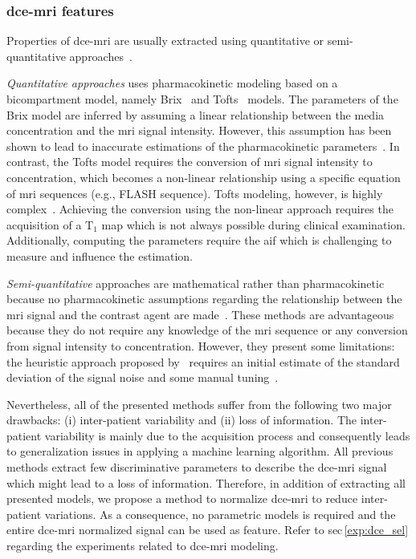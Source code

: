 \documentclass[a4paper,num-refs]{wiley-article}
\begin{document}
\subsubsection{\acs*{dce}-\acs*{mri} features}

Properties of \ac{dce}-\ac{mri} are usually extracted using quantitative or
semi-quantitative approaches~\cite{lemaitre2015computer}.

\emph{Quantitative approaches} uses pharmacokinetic modeling based on a
bicompartment model, namely Brix~\cite{brix1991pharmacokinetic} and
Tofts~\cite{tofts1995quantitative} models. The parameters of the Brix model
are inferred by assuming a linear relationship between the media concentration
and the \ac{mri} signal intensity. However, this assumption has been shown to
lead to inaccurate estimations of the pharmacokinetic
parameters~\cite{heilmann2006determination}. In contrast, the Tofts model
requires the conversion of \ac{mri} signal intensity to concentration, which
becomes a non-linear relationship using a specific equation of \ac{mri}
sequences (e.g., FLASH sequence). Tofts modeling, however, is highly
complex~\cite{gliozzi2011phenomenological}. Achieving the conversion using the
non-linear approach requires the acquisition of a T$_1$ map which is not always
possible during clinical examination. Additionally, computing the parameters
require the \ac{aif} which is challenging to measure and influence the estimation.

\emph{Semi-quantitative} approaches are mathematical rather than
pharmacokinetic because no pharmacokinetic assumptions regarding the
relationship between the \ac{mri} signal and the contrast agent are
made~\cite{huisman2001accurate,gliozzi2011phenomenological}. These methods are
advantageous because they do not require any knowledge of the \ac{mri} sequence
or any conversion from signal intensity to concentration. However, they present
some limitations: the heuristic approach proposed
by~\citeauthor{huisman2001accurate} requires an initial estimate of the
standard deviation of the signal noise and some manual
tuning~\cite{huisman2001accurate}.

Nevertheless, all of the presented methods suffer from the following two major
drawbacks: (i) inter-patient variability and (ii) loss of information. The
inter-patient variability is mainly due to the acquisition process and
consequently leads to generalization issues in applying a machine learning
algorithm. All previous methods extract few discriminative parameters to
describe the \ac{dce}-\ac{mri} signal which might lead to a loss of
information. Therefore, in addition of extracting all presented models, we
propose a method to normalize \ac{dce}-\ac{mri} to reduce inter-patient
variations. As a consequence, no parametric models is required and the entire
\ac{dce}-\ac{mri} normalized signal can be used as feature. Refer to
\acs{sec}\,\ref{exp:dce_sel} regarding the experiments related to
\ac{dce}-\ac{mri} modeling.
\end{document}
